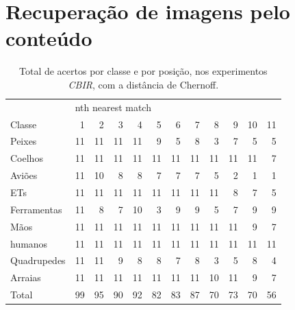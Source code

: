 \section{Recuperação de imagens pelo conteúdo}

\begin{table}
\centering
\caption{\label{tab:KimiaChernoff} Total de acertos por classe e por posição, nos experimentos \emph{CBIR}, com a distância de Chernoff.}
\begin{tabular}{l| r r r r r r r r r r r}
\hline
&\multicolumn{11}{l}{nth nearest match} \\
\cline{2-12}
Classe&1&2&3&4&5&6&7&8&9&10&11 \\
 \hline
Peixes&11&11&11&11&9&5&8&3&7&5&5\\
Coelhos&11&11&11&11&11&11&11&11&11&11&7\\ 
Aviões&11&10&8&8&7&7&7&5&2&1&1\\
ETs&11&11&11&11&11&11&11&11&8&7&5\\
Ferramentas&11&8&7&10&3&9&9&5&7&9&9\\
Mãos&11&11&11&11&11&11&11&11&11&9&7\\
humanos&11&11&11&11&11&11&11&11&11&11&11\\
Quadrupedes&11&11&9&8&8&7&8&3&5&8&4\\
Arraias&11&11&11&11&11&11&11&10&11&9&7\\
\hline
Total&99&95&90&92&82&83&87&70&73&70&56\\
\hline
\end{tabular}
\end{table}

